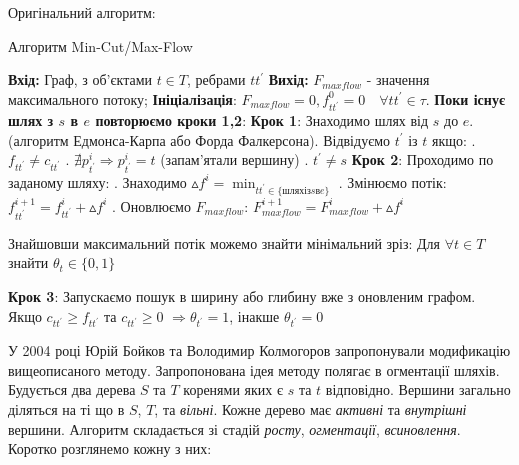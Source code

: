 Оригінальний алгоритм:

\begin{algorithm}[H]
    \caption{Алгоритм Min-Cut/Max-Flow}
    \begin{algorithmic}
    \State \textbf{Вхід:} Граф, з об'єктами $t \in T$, ребрами $tt^{'}$
    \State \textbf{Вихід:} $F_{maxflow}$ - значення максимального потоку;
    \State \textbf{Ініціалізація}: $F_{maxflow} = 0, f_{tt^{'}}^{0} = 0 \quad  \forall tt^{'}  \in \tau$.
    \State \textbf{Поки існує шлях з $s$ в $e$ повторюємо кроки 1,2}:    
    \State \textbf{Крок 1}: Знаходимо шлях від $s$ до $e$.
    (алгоритм Едмонса-Карпа або Форда Фалкерсона).
    \State Відвідуємо $t^{'}$ із $t$ якщо:
            \State {}. $f_{tt^{'}} \neq   c_{tt^{'}}$
            \State {}. $ \nexists p_{t^{'}}^{i} \Rightarrow  p_{t^{'}}^{i} = t $ (запам'ятали вершину)
            \State {}. $ t^{'} \neq s $
    \State \textbf{Крок 2}: Проходимо по заданому шляху: 
            \State {}. Знаходимо $ \vartriangle f^{i} = \min_{tt^{'} \in \{шлях із s в e \}} $
            \State {}. Змінюємо потік: $ f_{tt^{'}}^{i+1} = f_{tt^{'}}^{i} + \vartriangle f^{i} $
            \State {}. Оновлюємо $F_{maxflow}$: $ F_{maxflow}^{i+1}  = F_{maxflow}^{i} + \vartriangle f^{i} $ 
    \end{algorithmic}

Знайшовши максимальний потік можемо знайти мінімальний зріз:
Для $\forall t \in T$ знайти $\theta_{t} \in \{0,1\}$
    \begin{algorithmic}
    \State \textbf{Крок 3}: Запускаємо пошук в ширину або глибину вже з оновленим графом.   
    \State \qquad Якщо $c_{tt^{'}} \geqslant f_{tt^{'}}$ та $c_{tt^{'}} \geqslant 0$
    $\Rightarrow \theta_{t^{'}} = 1 $, інакше $\theta_{t^{'}} = 0 $
    \end{algorithmic}
\end{algorithm}

У 2004 році Юрій Бойков та Володимир Колмогоров запропонували модификацію вищеописаного
методу.
Запропонована ідея методу полягає в огментації шляхів. Будується два дерева $S$ та $T$
коренями яких є $s$ та $t$ відповідно. Вершини загально діляться на ті що в $S$, $T$, та 
\textit{вільні}. Кожне дерево має \textit{активні} та \textit{внутрішні} вершини.
Алгоритм складається зі стадій \textit{росту}, \textit{огментації}, \textit{всиновлення}.\\
Коротко розглянемо кожну з них:

